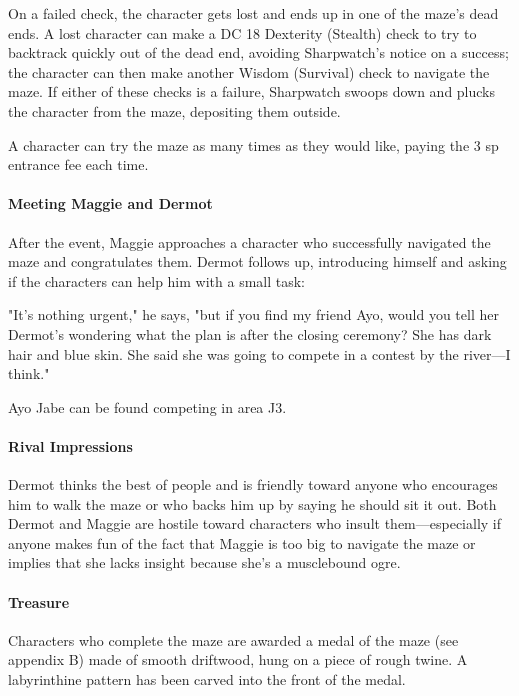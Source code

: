 \documentclass[10pt,a4paper,twoside,bg=print,twocolumn,openany,nodeprecatedcode]{dndbook}
\begin{document}
On a failed check, the character gets lost and ends up in one of the maze's dead ends. A lost character can make a DC 18 Dexterity (Stealth) check to try to backtrack quickly out of the dead end, avoiding Sharpwatch's notice on a success; the character can then make another Wisdom (Survival) check to navigate the maze. If either of these checks is a failure, Sharpwatch swoops down and plucks the character from the maze, depositing them outside.

A character can try the maze as many times as they would like, paying the 3 sp entrance fee each time.

\paragraph{Meeting Maggie and Dermot}
After the event, Maggie approaches a character who successfully navigated the maze and congratulates them. Dermot follows up, introducing himself and asking if the characters can help him with a small task:

\begin{DndReadAloud}{}
"It's nothing urgent," he says, "but if you find my friend Ayo, would you tell her Dermot's wondering what the plan is after the closing ceremony? She has dark hair and blue skin. She said she was going to compete in a contest by the river—I think."

\end{DndReadAloud}

Ayo Jabe can be found competing in area J3.

\paragraph{Rival Impressions}
Dermot thinks the best of people and is friendly toward anyone who encourages him to walk the maze or who backs him up by saying he should sit it out. Both Dermot and Maggie are hostile toward characters who insult them—especially if anyone makes fun of the fact that Maggie is too big to navigate the maze or implies that she lacks insight because she's a musclebound ogre.

\paragraph{Treasure}
Characters who complete the maze are awarded a medal of the maze (see appendix B) made of smooth driftwood, hung on a piece of rough twine. A labyrinthine pattern has been carved into the front of the medal.
\end{document}
